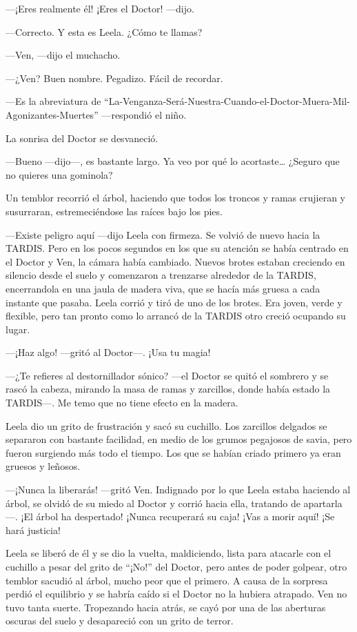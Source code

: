 ---¡Eres realmente él! ¡Eres el Doctor! ---dijo.

---Correcto. Y esta es Leela. ¿Cómo te llamas?

---Ven, ---dijo el muchacho.

---¿Ven? Buen nombre. Pegadizo. Fácil de recordar.

---Es la abreviatura de
``La-Venganza-Será-Nuestra-Cuando-el-Doctor-Muera-Mil-Agonizantes-Muertes''
---respondió el niño.

La sonrisa del Doctor se desvaneció.

---Bueno ---dijo---, es bastante largo. Ya veo por qué lo
acortaste\ldots{} ¿Seguro que no quieres una gominola?

Un temblor recorrió el árbol, haciendo que todos los troncos y ramas
crujieran y susurraran, estremeciéndose las raíces bajo los pies.

---Existe peligro aquí ---dijo Leela con firmeza. Se volvió de nuevo
hacia la TARDIS. Pero en los pocos segundos en los que su atención se
había centrado en el Doctor y Ven, la cámara había cambiado. Nuevos
brotes estaban creciendo en silencio desde el suelo y comenzaron a
trenzarse alrededor de la TARDIS, encerrandola en una jaula de madera
viva, que se hacía más gruesa a cada instante que pasaba. Leela corrió y
tiró de uno de los brotes. Era joven, verde y flexible, pero tan pronto
como lo arrancó de la TARDIS otro creció ocupando su lugar.

---¡Haz algo! ---gritó al Doctor---. ¡Usa tu magia!

---¿Te refieres al destornillador sónico? ---el Doctor se quitó el
sombrero y se rascó la cabeza, mirando la masa de ramas y zarcillos,
donde había estado la TARDIS---. Me temo que no tiene efecto en la
madera.

Leela dio un grito de frustración y sacó su cuchillo. Los zarcillos
delgados se separaron con bastante facilidad, en medio de los grumos
pegajosos de savia, pero fueron surgiendo más todo el tiempo. Los que se
habían criado primero ya eran gruesos y leñosos.

---¡Nunca la liberarás! ---gritó Ven. Indignado por lo que Leela estaba
haciendo al árbol, se olvidó de su miedo al Doctor y corrió hacia ella,
tratando de apartarla---. ¡El árbol ha despertado! ¡Nunca recuperará su
caja! ¡Vas a morir aquí! ¡Se hará justicia!

Leela se liberó de él y se dio la vuelta, maldiciendo, lista para
atacarle con el cuchillo a pesar del grito de ``¡No!'' del Doctor, pero
antes de poder golpear, otro temblor sacudió al árbol, mucho peor que el
primero. A causa de la sorpresa perdió el equilibrio y se habría caído
si el Doctor no la hubiera atrapado. Ven no tuvo tanta suerte.
Tropezando hacia atrás, se cayó por una de las aberturas oscuras del
suelo y desapareció con un grito de terror.

